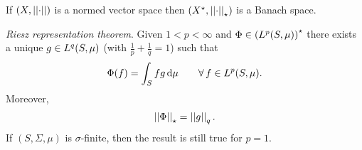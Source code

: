 \documentclass{article}
\begin{document}
\begin{corollary}
	If $\left(X,\left|\left|\cdot\right|\right|\right)$ is a normed vector space then $\left(X^{\star},\left|\left|\cdot\right|\right|_{\star}\right)$ is a Banach space.
\end{corollary}
\begin{theorem}
	\emph{Riesz representation theorem}. Given $1<p<\infty$ and $\Phi\in\left(L^{p}(S,\mu)\right)^{\star}$ there exists a unique $g\in L^{q}(S,\mu)$ (with $\frac{1}{p}+\frac{1}{q}=1$) such that
	\begin{equation*}
		\Phi(f)=\int_{S}fg\mathop{}\!\mathrm{d}\mu\qquad\forall\, f\in L^{p}(S,\mu)
.	\end{equation*}
Moreover,
\begin{equation*}
	\left|\left|\Phi\right|\right|_{\star}=\left|\left|g\right|\right|_{q}.
\end{equation*}
If $(S,\Sigma,\mu)$ is $\sigma$-finite, then the result is still true for $p=1$.
\end{theorem}
\end{document}
